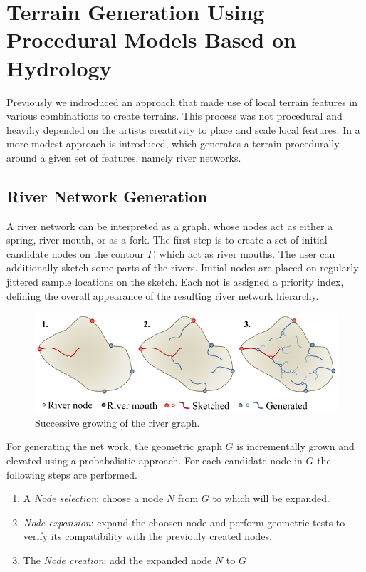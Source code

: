 \section{Terrain Generation Using Procedural Models Based on Hydrology}
Previously we indroduced an approach that made use of local terrain features in various combinations to create terrains. This process was not procedural and heaviliy depended on the artists creatitvity to place and scale local features. In \cite{Genevaux:2013:TGU:2461912.2461996} a more modest approach is introduced, which generates a terrain procedurally around a given set of features, namely river networks.
 
\subsection{River Network Generation}
A river network can be interpreted as a graph, whose nodes act as either a spring, river mouth, or as a fork. 
The first step is to create a set of initial candidate nodes on the contour $\Gamma$, which act as river mouths. The user can additionally sketch some parts of the rivers. Initial nodes are placed on regularly jittered sample locations on the sketch. Each not is assigned a priority index, defining the overall appearance of the resulting river network hierarchy. 

\begin{figure}[htb]
	\centering
	\includegraphics[width=\linewidth]{GGG13/river_network_sketch}
	\caption{Successive growing of the river graph. }
	\label{fig:river_network_sketch}
\end{figure}

For generating the net work, the geometric graph $G$ is incrementally grown and elevated using a probabalistic approach. For each candidate node in $G$ the following steps are performed. 
\begin{enumerate}
	\item A \textit{Node selection}: choose a node $N$ from $G$ to which will be expanded.
	\item \textit{Node expansion}: expand the choosen node and perform geometric tests to verify its compatibility with the previouly created nodes. 
	\item The \textit{Node creation}: add the expanded node $N$ to $G$ 
\end{enumerate}

